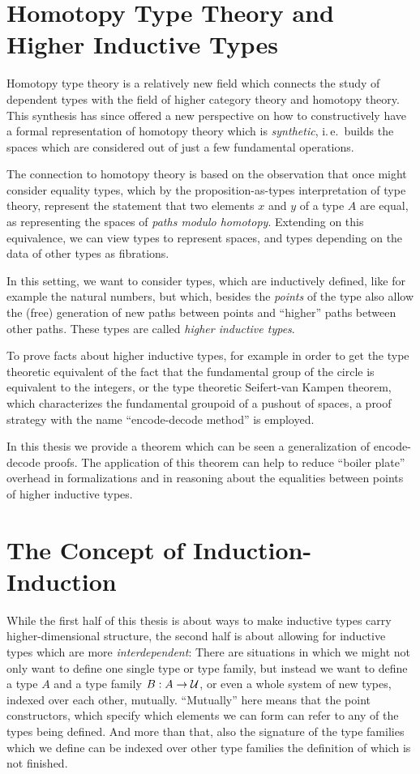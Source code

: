 \section{Homotopy Type Theory and Higher Inductive Types}

Homotopy type theory is a relatively new field which connects the study of
dependent types with the field of higher category theory and homotopy theory.
This synthesis has since offered a new perspective on how to constructively
have a formal representation of homotopy theory which is \emph{synthetic},
i.\,e.\ builds the spaces which are considered out of just a few fundamental
operations.

The connection to homotopy theory is based on the observation that once might
consider equality types, which by the proposition-as-types interpretation of type
theory, represent the statement that two elements $x$ and $y$ of a type $A$
are equal, as representing the spaces of \emph{paths modulo homotopy}.
Extending on this equivalence, we can view types to represent spaces,
and types depending on the data of other types as fibrations.

In this setting, we want to consider types, which are inductively defined,
like for example the natural numbers, but which, besides the \emph{points}
of the type also allow the (free) generation of new paths between points
and ``higher'' paths between
other paths.
These types are called \emph{higher inductive types}.

To prove facts about higher inductive types, for example in order to get the
type theoretic equivalent of the fact that the fundamental group of the circle
is equivalent to the integers, or the type theoretic Seifert-van Kampen theorem,
which characterizes the fundamental groupoid of a pushout of spaces,
a proof strategy with the name ``encode-decode method'' is employed.

In this thesis we provide a theorem which can be seen a generalization of
encode-decode proofs.
The application of this theorem can help to reduce ``boiler plate'' overhead
in formalizations and in reasoning about the equalities between points
of higher inductive types.

\section{The Concept of Induction-Induction}\label{sec:intro-iit}

While the first half of this thesis is about ways to make inductive types carry
higher-dimensional structure, the second half is about allowing for inductive types
which are more \emph{interdependent}:
There are situations in which we might not only want to define one single type
or type family, but instead we want to define a type $A$ and a type family $B : A \to \mathcal{U}$,
or even a whole system of new types, indexed over each other,
mutually.
``Mutually'' here means that the point constructors, which specify which elements
we can form can refer to any of the types being defined.
And more than that, also the signature of the type families which we define can
be indexed over other type families the definition of which is not finished.

